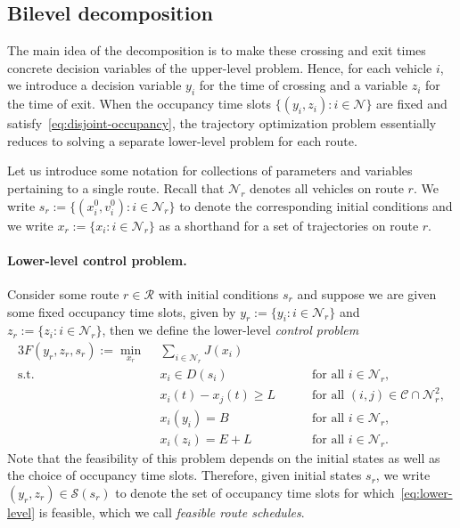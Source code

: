 \documentclass{report}
\theoremstyle{definition}
\theoremstyle{plain}
\begin{document}
\subsection{Bilevel decomposition}\label{sec:bilevel}
The main idea of the decomposition is to make these crossing and exit times
concrete decision variables of the upper-level problem.
%
Hence, for each vehicle $i$, we introduce a decision variable $y_{i}$ for the
time of crossing and a variable $z_{i}$ for the time of exit.
%
When the occupancy time slots $\{(y_{i}, z_{i}) : i \in \mathcal{N}\}$ are fixed
and satisfy~\eqref{eq:disjoint-occupancy}, the trajectory optimization problem
essentially reduces to solving a separate lower-level problem for each route.

Let us introduce some notation for collections of parameters and variables
pertaining to a single route.
%
Recall that $\mathcal{N}_{r}$ denotes all vehicles on route $r$.
We write $s_{r} := \{(x_{i}^{0}, v_{i}^{0}) : i \in \mathcal{N}_{r} \}$ to
denote the corresponding initial conditions and we write
$x_{r} := \{x_{i} : i \in \mathcal{N}_{r} \}$ as a shorthand for a set of
trajectories on route $r$.

\paragraph{Lower-level control problem.}
Consider some route $r \in \mathcal{R}$ with initial conditions $s_{r}$ and
suppose we are given some fixed occupancy time slots, given by
$y_{r} := \{y_{i} : i \in \mathcal{N}_{r}\}$ and
$z_{r} := \{z_{i} : i \in \mathcal{N}_{r}\}$, then we define the lower-level \emph{control problem}
%
\begin{alignat}{3}\label{eq:lower-level}
  F(y_{r},z_{r}, s_{r}) := \min_{x_{r}} \;\, & \sum_{i \in \mathcal{N}_{r}} J(x_{i}) \tag{L} \\
  \text{s.t. } \; & x_{i} \in D(s_{i})  && \quad \text{ for all } i \in \mathcal{N}_{r} , \tag{L.1} \label{eq:L1} \\
  & x_{i}(t) - x_{j}(t) \geq L && \quad \text{ for all } (i,j) \in \mathcal{C} \cap \mathcal{N}_{r}^2 , \tag{L.2} \label{eq:L2} \\
  & x_{i}(y_i) = B  && \quad \text{ for all } i \in \mathcal{N}_{r} , \tag{L.3} \label{eq:L3} \\
  & x_{i}(z_{i}) = E + L  && \quad \text{ for all } i \in \mathcal{N}_{r} . \tag{L.4} \label{eq:L4}
\end{alignat}
%
Note that the feasibility of this problem depends on the initial states as well
as the choice of occupancy time slots. Therefore, given initial states $s_{r}$,
we write $(y_{r}, z_{r}) \in \mathcal{S}(s_{r})$ to denote the set of occupancy
time slots for which~\eqref{eq:lower-level} is feasible, which we call
\emph{feasible route schedules}.
\end{document}
